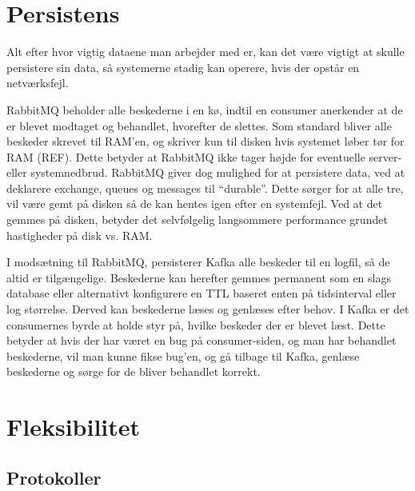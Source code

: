 \documentclass[
]{article}
\begin{document}
\hypertarget{persistens}{%
\section{Persistens}\label{persistens}}

Alt efter hvor vigtig dataene man arbejder med er, kan det være vigtigt
at skulle persistere sin data, så systemerne stadig kan operere, hvis
der opstår en netværksfejl.


RabbitMQ beholder alle beskederne i en kø, indtil en consumer anerkender
at de er blevet modtaget og behandlet, hvorefter de slettes. Som
standard bliver alle beskeder skrevet til RAM'en, og skriver kun til
disken hvis systemet løber tør for RAM (REF). Dette betyder at RabbitMQ
ikke tager højde for eventuelle server- eller systemnedbrud.\cite{rabbit-persistence} RabbitMQ giver dog mulighed for at persistere data, ved at deklarere exchange,
queues og messages til ``durable''.\cite{rabbit-durable} Dette sørger for at alle tre, vil
være gemt på disken så de kan hentes igen efter en systemfejl. Ved at
det gemmes på disken, betyder det selvfølgelig langsommere performance
grundet hastigheder på disk vs. RAM.

I modsætning til RabbitMQ, persisterer Kafka alle beskeder til en
logfil, så de altid er tilgængelige. Beskederne kan herefter gemmes
permanent som en slags database eller alternativt konfigurere en TTL
baseret enten på tidsinterval eller log størrelse. Derved kan beskederne
læses og genlæses efter behov. I Kafka er det consumernes byrde at holde
styr på, hvilke beskeder der er blevet læst. Dette betyder at hvis der
har været en bug på consumer-siden, og man har behandlet beskederne, vil
man kunne fikse bug'en, og gå tilbage til Kafka, genlæse beskederne og
sørge for de bliver behandlet korrekt.

\hypertarget{fleksibilitet}{%
\section{Fleksibilitet}\label{fleksibilitet}}

\hypertarget{section}{%
\subsection{}\label{section}}

\hypertarget{protokoller}{%
\subsection{Protokoller}\label{protokoller}}
\end{document}
